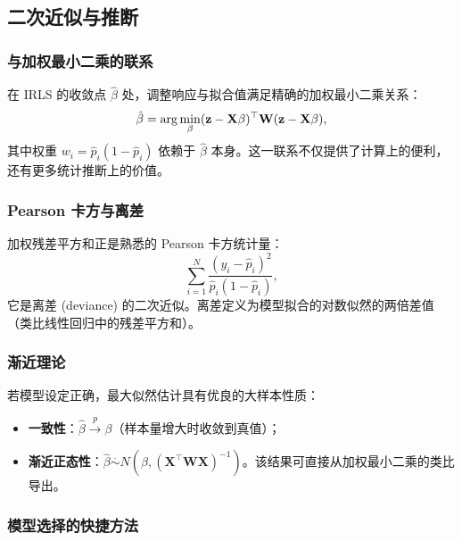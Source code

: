 \subsection{二次近似与推断}

\subsubsection{与加权最小二乘的联系}

在 IRLS 的收敛点 $\hat{\beta}$ 处，调整响应与拟合值满足精确的加权最小二乘关系：
\begin{equation}\label{eq:z_ls_relation}
    \hat{\beta} = \arg\min_\beta (\mathbf{z} - \mathbf{X}\beta)^\top \mathbf{W} (\mathbf{z} - \mathbf{X}\beta),
\end{equation}
其中权重 $w_i = \hat{p}_i(1 - \hat{p}_i)$ 依赖于 $\hat{\beta}$ 本身。这一联系不仅提供了计算上的便利，还有更多统计推断上的价值。

\subsubsection{Pearson 卡方与离差}

加权残差平方和正是熟悉的 Pearson 卡方统计量：
\begin{equation}\label{eq:pearson_chi}
    \sum_{i=1}^{N} \frac{(y_i - \hat{p}_i)^2}{\hat{p}_i(1 - \hat{p}_i)},
\end{equation}
它是离差 (deviance) 的二次近似。离差定义为模型拟合的对数似然的两倍差值（类比线性回归中的残差平方和）。

\subsubsection{渐近理论}

若模型设定正确，最大似然估计具有优良的大样本性质：
\begin{itemize}
    \item \textbf{一致性}：$\hat{\beta} \xrightarrow{p} \beta$（样本量增大时收敛到真值）；
    \item \textbf{渐近正态性}：$\hat{\beta} \stackrel{\cdot}{\sim} N(\beta, (\mathbf{X}^\top \mathbf{W} \mathbf{X})^{-1})$。该结果可直接从加权最小二乘的类比导出。
\end{itemize}

\subsubsection{模型选择的快捷方法}

